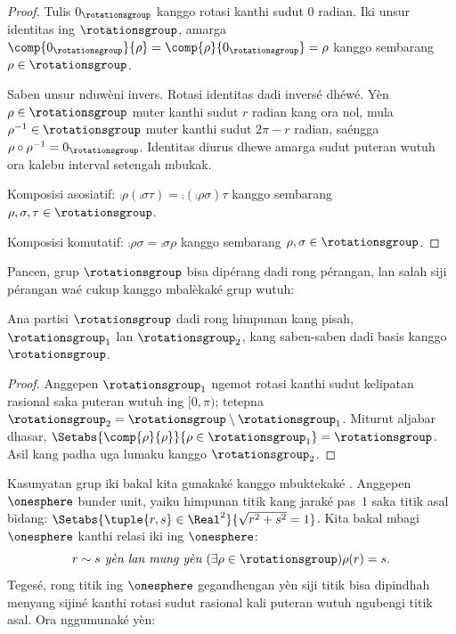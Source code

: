 \documentclass[../../../include/open-logic-section]{subfiles}
\begin{document}
\begin{proof}
Tulis $0_{\rotationsgroup}$ kanggo rotasi kanthi sudut $0$ radian.
Iki unsur identitas ing $\rotationsgroup$, amarga
$\comp{0_{\rotationsgroup}}{\rho} = \comp{\rho}{0_{\rotationsgroup}} =
\rho$ kanggo sembarang $\rho \in \rotationsgroup$.

Saben unsur nduwèni invers. Rotasi identitas dadi inversé dhéwé.
Yèn $\rho \in \rotationsgroup$ muter kanthi sudut $r$ radian kang
ora nol, mula $\rho^{-1} \in \rotationsgroup$ muter kanthi sudut
$2\pi - r$ radian, saéngga $\rho \circ \rho^{-1} = 0_\rotationsgroup$.
Identitas diurus dhewe amarga sudut puteran wutuh ora kalebu interval setengah mbukak.

Komposisi asosiatif: $\comp{\rho}{(\comp{\sigma}{\tau})} =
\comp{(\comp{\rho}{\sigma})}{\tau}$ kanggo sembarang
$\rho, \sigma, \tau \in \rotationsgroup$.

Komposisi komutatif: $\comp{\rho}{\sigma} =
\comp{\sigma}{\rho}$ kanggo sembarang $\rho, \sigma \in
\rotationsgroup$.
\end{proof}

Pancen, grup $\rotationsgroup$ bisa dipérang dadi rong pérangan,
lan salah siji pérangan waé cukup kanggo mbalèkaké grup wutuh:

\begin{lem}
Ana partisi $\rotationsgroup$ dadi rong himpunan kang pisah,
$\rotationsgroup_{1}$ lan $\rotationsgroup_{2}$, kang saben-saben
dadi basis kanggo $\rotationsgroup$.
\end{lem}

\begin{proof}
Anggepen $\rotationsgroup_{1}$ ngemot rotasi kanthi sudut
kelipatan rasional saka puteran wutuh ing $[0, \pi)$; tetepna
$\rotationsgroup_{2} = \rotationsgroup \setminus \rotationsgroup_1$.
Miturut aljabar dhasar,
$\Setabs{\comp{\rho}{\rho}}{\rho \in \rotationsgroup_1} =
\rotationsgroup$. Asil kang padha uga lumaku kanggo
$\rotationsgroup_2$.
\end{proof}

Kasunyatan grup iki bakal kita gunakaké kanggo mbuktekaké
. Anggepen $\onesphere$ bunder unit,
yaiku himpunan titik kang jaraké pas~$1$ saka titik asal bidang:
$\Setabs{\tuple{r,s} \in \Real^2}{\sqrt{r^2+s^2}=1}$.
Kita bakal mbagi $\onesphere$ kanthi relasi iki ing $\onesphere$:
\[
	r \sim s \emph{ yèn lan mung yèn }(\exists \rho \in \rotationsgroup)\rho(r) = s.
\]
Tegesé, rong titik ing $\onesphere$ gegandhengan yèn siji titik
bisa dipindhah menyang sijiné kanthi rotasi sudut rasional kali
puteran wutuh ngubengi titik asal. Ora nggumunaké yèn:
\end{document}
